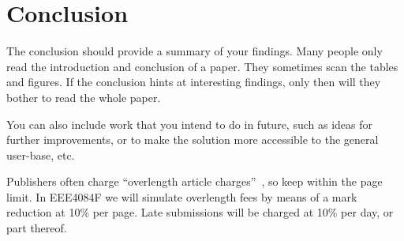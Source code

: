 \section{Conclusion}
The conclusion should provide a summary of your findings.  Many people only read the introduction and conclusion of a paper.  They sometimes scan the tables and figures.  If the conclusion hints at interesting findings, only then will they bother to read the whole paper.

You can also include work that you intend to do in future, such as ideas for further improvements, or to make the solution more accessible to the general user-base, etc.

Publishers often charge ``overlength article charges''~\cite{Overlength_Fee}, so keep within the page limit.  In EEE4084F we will simulate overlength fees by means of a mark reduction at 10\% per page.  Late submissions will be charged at 10\% per day, or part thereof.

